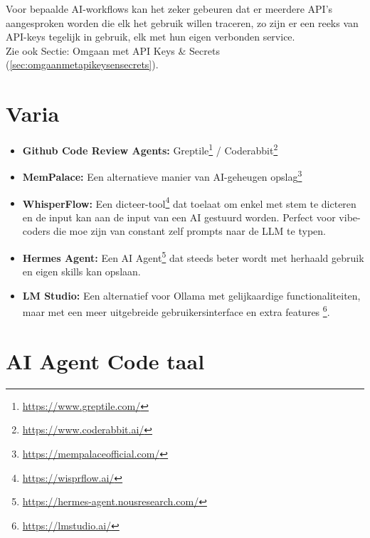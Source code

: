 Voor bepaalde AI-workflows kan het zeker gebeuren dat er meerdere API's aangesproken worden die elk het gebruik willen traceren, zo zijn er een reeks van API-keys tegelijk in gebruik, elk met hun eigen verbonden service. \\

Zie ook Sectie: Omgaan met API Keys \& Secrets (\ref{sec:omgaanmetapikeysensecrets}).

\section{Varia}
\label{sec:varia}

\begin{itemize}
    \item \textbf{Github Code Review Agents:} Greptile\footnote{\href{https://www.greptile.com/}{https://www.greptile.com/}} / Coderabbit\footnote{\href{https://www.coderabbit.ai/}{https://www.coderabbit.ai/}}
    \item \textbf{MemPalace:} Een alternatieve manier van AI-geheugen opslag\footnote{\href{https://mempalaceofficial.com/}{https://mempalaceofficial.com/}}
    \item \textbf{WhisperFlow:} Een dicteer-tool\footnote{\href{https://wisprflow.ai/}{https://wisprflow.ai/}} dat toelaat om enkel met stem te dicteren en de input kan aan de input van een AI gestuurd worden. Perfect voor vibe-coders die moe zijn van constant zelf prompts naar de LLM te typen.
    \item \textbf{Hermes Agent:} Een AI Agent\footnote{\href{https://hermes-agent.nousresearch.com/}{https://hermes-agent.nousresearch.com/}} dat steeds beter wordt met herhaald gebruik en eigen skills kan opslaan. 
    \item \textbf{LM Studio:} Een alternatief voor Ollama met gelijkaardige functionaliteiten, maar met een meer uitgebreide  gebruikersinterface en extra features \footnote{\href{https://lmstudio.ai/}{https://lmstudio.ai/}}.
\end{itemize}



\section{AI Agent Code taal}
\label{sec:aiagentcodetaal}

